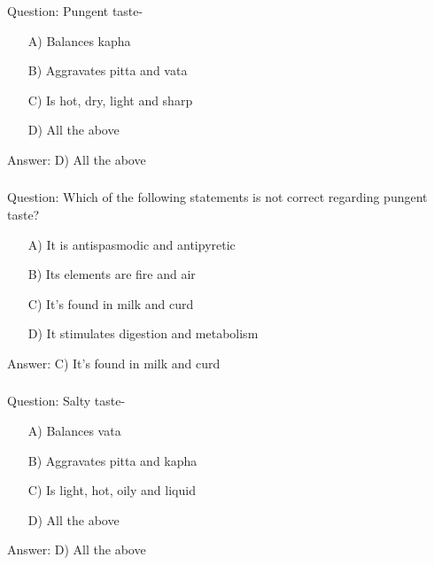 \begin{frame}[fragile]\frametitle{}

Question: Pungent taste-

\begin{itemize}
\item[A)] Balances kapha
\item[B)] Aggravates pitta and vata
\item[C)] Is hot, dry, light and sharp
\item[D)] All the above
\end{itemize}

Answer: D) All the above
\end{frame}

\begin{frame}[fragile]\frametitle{}

Question: Which of the following statements is not correct regarding pungent taste?

\begin{itemize}
\item[A)] It is antispasmodic and antipyretic
\item[B)] Its elements are fire and air
\item[C)] It's found in milk and curd
\item[D)] It stimulates digestion and metabolism
\end{itemize}

Answer: C) It's found in milk and curd
\end{frame}

\begin{frame}[fragile]\frametitle{}

Question: Salty taste-

\begin{itemize}
\item[A)] Balances vata
\item[B)] Aggravates pitta and kapha
\item[C)] Is light, hot, oily and liquid
\item[D)] All the above
\end{itemize}

Answer: D) All the above
\end{frame}

